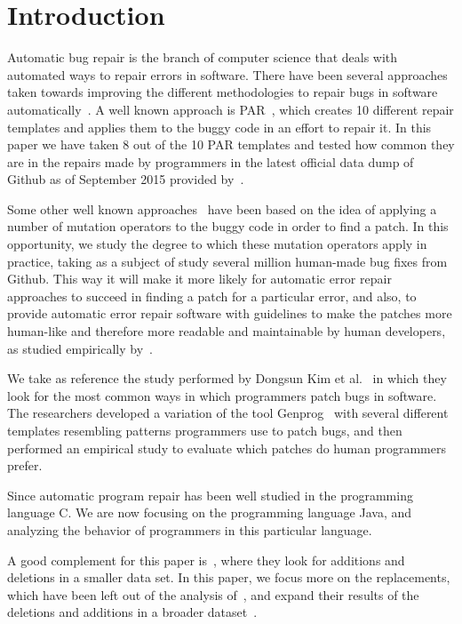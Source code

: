 \documentclass{sig-alternate-05-2015}
\begin{document}


\section{Introduction}

Automatic bug repair is the branch of computer science that deals with automated
ways to repair errors in software. There have been several approaches taken
towards improving the different methodologies to repair bugs in software
automatically~\cite{kim2013,weimer2009,legoues2012,pan2009}. A well known approach is PAR~\cite{kim2013}, which creates 10 different repair templates and applies them to the buggy code in an effort to repair
it. In this paper we have taken 8 out of the 10 PAR templates and tested how
common they are in the repairs made by programmers in the latest official data
dump of Github as of September 2015 provided by~\cite{dyer2013}.

Some other well known approaches~\cite{weimer2009,legoues2012} have been based on the idea of applying a number of mutation operators to the buggy code in order to find a patch. In this opportunity, we study the degree to which these mutation operators apply in practice, taking as a subject of study several million human-made bug fixes from Github. This way it will make it more likely for automatic error repair approaches to succeed in
finding a patch for a particular error, and also, to provide automatic error
repair software with guidelines to make the patches more human-like and
therefore more readable and maintainable by human developers, as studied empirically by~\cite{kim2013}.

We take as reference the study performed by Dongsun Kim et al.~\cite{kim2013} in which they look for the most common ways in which programmers patch bugs in software. The
researchers developed a variation of the tool Genprog~\cite{weimer2009,legoues2012}
with several different templates resembling patterns programmers use to patch
bugs, and then performed an empirical study to evaluate which patches do human programmers prefer.

Since automatic program repair has been well studied in the programming language C. We are now focusing on the programming language Java, and analyzing the behavior of programmers in this particular language.

A good complement for this paper is~\cite{zhong2015}, where they look for additions and
deletions in a smaller data set. In this paper, we focus more on the replacements,
which have been left out of the analysis of~\cite{zhong2015}, and expand their results of the deletions and additions in a broader dataset~\cite{dyer2013}.
\end{document}
